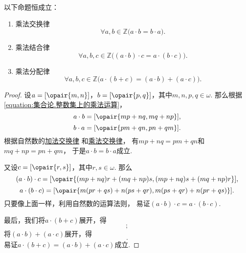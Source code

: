 \begin{theorem}\label{theorem:集合论.整数乘法的运算法则1}
以下命题恒成立：
\begin{enumerate}
	\item 乘法交换律
	\begin{equation}\label{equation:集合论.整数乘法交换律}
		\forall a,b\in\mathbb{Z} \bigl(
			a \cdot b = b \cdot a
		\bigr).
	\end{equation}
	\item 乘法结合律
	\begin{equation}\label{equation:集合论.整数乘法结合律}
		\forall a,b,c\in\mathbb{Z} \bigl(
			(a \cdot b) \cdot c = a \cdot (b \cdot c)
		\bigr).
	\end{equation}
	\item 乘法分配律
	\begin{equation}\label{equation:集合论.整数乘法分配律}
		\forall a,b,c\in\mathbb{Z} \bigl(
			a \cdot (b + c) = (a \cdot b) + (a \cdot c)
		\bigr).
	\end{equation}
\end{enumerate}
\begin{proof}
设\(a=[\opair{m,n}]\)，\(b=[\opair{p,q}]\)，其中\(m,n,p,q\in\omega\).
那么根据\cref{equation:集合论.整数集上的乘法运算}，\begin{equation*}
	a \cdot b = [\opair{mp+nq,mq+np}],
\end{equation*}\begin{equation*}
	b \cdot a = [\opair{pm+qn,pn+qm}].
\end{equation*}
根据自然数的\hyperref[equation:集合论.自然数加法交换律]{加法交换律}%
和\hyperref[equation:集合论.自然数乘法交换律]{乘法交换律}，
有\(mp+nq=pm+qn\)和\(mq+np=pn+qm\)，
于是\(a \cdot b = b \cdot a\)成立.

又设\(c=[\opair{r,s}]\)，其中\(r,s\in\omega\).
那么\begin{equation*}
	(a \cdot b) \cdot c
	= [\opair{(mp+nq)r+(mq+np)s,(mp+nq)s+(mq+np)r}],
\end{equation*}\begin{equation*}
	a \cdot (b \cdot c)
	= [\opair{m(pr+qs)+n(ps+qr),m(ps+qr)+n(pr+qs)}].
\end{equation*}
只要像上面一样，利用自然数的运算法则，
易证\((a \cdot b) \cdot c = a \cdot (b \cdot c)\).

最后，我们将\(a \cdot (b+c)\)展开，得\begin{equation*}
	[\opair{m(p+r)+n(q+s),m(q+s)+n(p+r)}];
\end{equation*}
将\((a \cdot b) + (a \cdot c)\)展开，得\begin{equation*}
	[\opair{mp+nq+mr+ns,mq+np+ms+nr}].
\end{equation*}
易证\(a \cdot (b + c) = (a \cdot b) + (a \cdot c)\)成立.
\end{proof}
\end{theorem}


